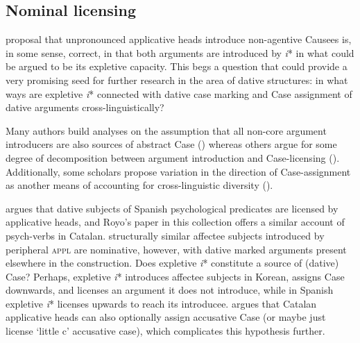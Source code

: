 \documentclass[output=paper,modfonts,nonflat,colorlinks,citecolor=brown]{langsci/langscibook}
\begin{document}
\subsection{Nominal licensing}\label{sec:wechsler:4.2}

 proposal that unpronounced applicative heads introduce non-agentive Causees is, in some sense, correct, in that both arguments are introduced by \textit{i}* in what could be argued to be its expletive capacity. This begs a question that could provide a very promising seed for further research in the area of dative structures: in what ways are expletive \textit{i}* connected with dative case marking and Case assignment of dative arguments cross-linguistically?



Many authors build analyses on the assumption that all non-core argument introducers are also sources of abstract Case (\citealt{MchomboFirmino1999,Jeong2007,Cuervo2003,Cuervo2010born,Cuervo2015,Sheehan2013,vanderWal2017}) whereas others argue for some degree of decomposition between argument introduction and Case-licensing (\citealt{BakerCollins2006,GeorgalaEtAl2008,Georgala2012,HaddicanHolmberg2012,Halpert2012,Wechsler2014,Wechsler2016}). Additionally, some scholars propose variation in the direction of Case-assignment as another means of accounting for cross-linguistic diversity (\citealt{Sheehan2013,vanderWal2017,Baker2008}).



\citet{Cuervo2003,Cuervo2010born} argues that dative subjects of Spanish psychological predicates are licensed by applicative heads, and Royo’s paper in this collection offers a similar account of psych-verbs in Catalan.  structurally similar affectee subjects introduced by peripheral \textsc{appl} are nominative, however, with dative marked arguments present elsewhere in the construction. Does expletive \textit{i}* constitute a source of (dative) Case? Perhaps, expletive \textit{i}* introduces affectee subjects in Korean, assigns Case downwards, and licenses an argument it does not introduce, while in Spanish expletive \textit{i}* licenses upwards to reach its introducee.  argues that Catalan applicative heads can also optionally assign accusative Case (or maybe just license ‘little c’ accusative case), which complicates this hypothesis further.
\end{document}
